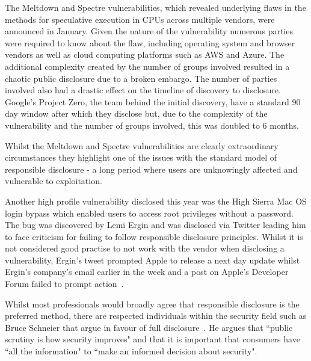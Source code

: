 \documentclass[]{final_report}
\begin{document}
The Meltdown and Spectre vulnerabilities, which revealed underlying flaws in the methods for speculative execution in CPUs across multiple vendors, were announced in January. Given the nature of the vulnerability numerous parties were required to know about the flaw, including operating system and browser vendors as well as cloud computing platforms such as AWS and Azure. The additional complexity created by the number of groups involved resulted in a chaotic public disclosure due to a broken embargo. The number of parties involved also had a drastic effect on the timeline of discovery to disclosure. Google's Project Zero, the team behind the initial discovery, have a standard 90 day window after which they disclose but, due to the complexity of the vulnerability and the number of groups involved, this was doubled to 6 months.

Whilst the Meltdown and Spectre vulnerabilities are clearly extraordinary circumstances they highlight one of the issues with the standard model of responsible disclosure - a long period where users are unknowingly affected and vulnerable to exploitation.

Another high profile vulnerability disclosed this year was the High Sierra Mac OS login bypass which enabled users to access root privileges without a password. The bug was discovered by Lemi Ergin and was disclosed via Twitter leading him to face criticism for failing to follow responsible disclosure principles. Whilst it is not considered good practise to not work with the vendor when disclosing a vulnerability, Ergin's tweet prompted Apple to release a next day update whilst Ergin's company's email earlier in the week and a post on Apple's Developer Forum failed to prompt action~\cite{ergin-disclosure}.

Whilst most professionals would broadly agree that responsible disclosure is the preferred method, there are respected individuals within the security field such as Bruce Schneier that argue in favour of full disclosure~\cite{debating-full-disclosure}. He argues that ``public scrutiny is how security improves" and that it is important that consumers have ``all the information" to ``make an informed decision about security".
\end{document}
